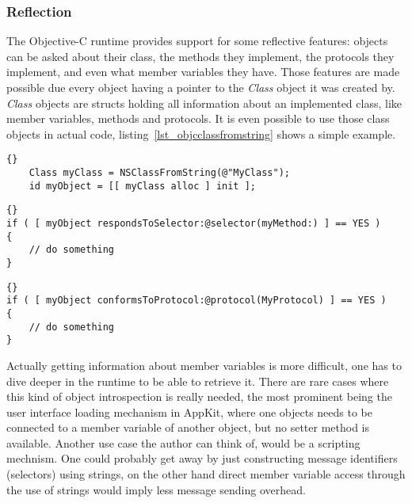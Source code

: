 \subsubsection{Reflection}
The Objective-C runtime provides support for some reflective features: objects
can be asked about their class, the methods they implement, the protocols they
implement, and even what member variables they have. Those features are made
possible due every object having a pointer to the \textit{Class} object it was
created by. \textit{Class} objects are structs holding all information about an
implemented class, like member variables, methods and protocols. It is even
possible to use those class objects in actual code,
listing~\ref{lst_objcclassfromstring} shows a simple example.

\begin{lstlisting}[captionpos=b, caption=Creating an object of a class given
only the class name., label=lst_objcclassfromstring, morekeywords={Class}]{}
    Class myClass = NSClassFromString(@"MyClass");
    id myObject = [[ myClass alloc ] init ];
\end{lstlisting}

\begin{lstlisting}[captionpos=b, caption=Check if an object responds to a
specific message.,
label=lst_objcinstancerespindstoselector]{}
if ( [ myObject respondsToSelector:@selector(myMethod:) ] == YES )
{
    // do something
}
\end{lstlisting}

\begin{lstlisting}[captionpos=b, caption=Check if an object implements a
specific protocol.,
label=lst_objcinstanceimplementsprotocol]{}
if ( [ myObject conformsToProtocol:@protocol(MyProtocol) ] == YES )
{
    // do something
}
\end{lstlisting}

Actually getting information about member variables is more difficult, one has
to dive deeper in the runtime to be able to retrieve it. There are rare cases
where this kind of object introspection is really needed, the most prominent
being the user interface loading mechanism in AppKit, where one objects needs
to be connected to a member variable of another object, but no setter method is
available. Another use case the author can think of, would be a scripting
mechnism. One could probably get away by just constructing message identifiers
(selectors) using strings, on the other hand direct member variable access
through the use of strings would imply less message sending overhead.

